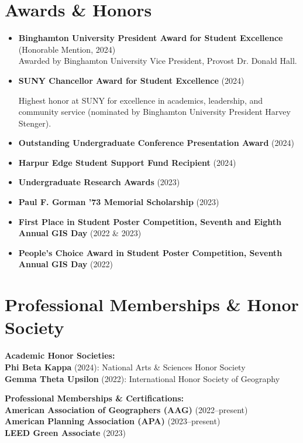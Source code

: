 \documentclass[11pt]{article}
\begin{document}
\section*{Awards \& Honors}
\begin{itemize}[leftmargin=*]
    \item \textbf{Binghamton University President Award for Student Excellence} (Honorable Mention, 2024) \\
    
Awarded by Binghamton University Vice President, Provost Dr. Donald Hall.
    \item \textbf{SUNY Chancellor Award for Student Excellence} (2024) 

Highest honor at SUNY for excellence in academics, leadership, and community service (nominated by Binghamton University President Harvey Stenger).
    \item \textbf{Outstanding Undergraduate Conference Presentation Award} (2024)
    \item \textbf{Harpur Edge Student Support Fund Recipient} (2024)
    \item \textbf{Undergraduate Research Awards} (2023)
    \item \textbf{Paul F. Gorman '73 Memorial Scholarship} (2023)
    \item \textbf{First Place in Student Poster Competition, Seventh and Eighth Annual GIS Day} (2022 \& 2023)
    \item \textbf{People's Choice Award in Student Poster Competition, Seventh Annual GIS Day} (2022)
\end{itemize}

\section*{Professional Memberships \& Honor Society}
\noindent
\textbf{Academic Honor Societies:} \\
\textbf{Phi Beta Kappa} (2024): National Arts \& Sciences Honor Society \\
\textbf{Gemma Theta Upsilon} (2022): International Honor Society of Geography

\vspace{2mm}
\noindent
\textbf{Professional Memberships \& Certifications:} \\
\textbf{American Association of Geographers (AAG) }(2022--present) \\
\textbf{American Planning Association (APA)} (2023--present) \\
\textbf{LEED Green Associate} (2023)
\end{document}
